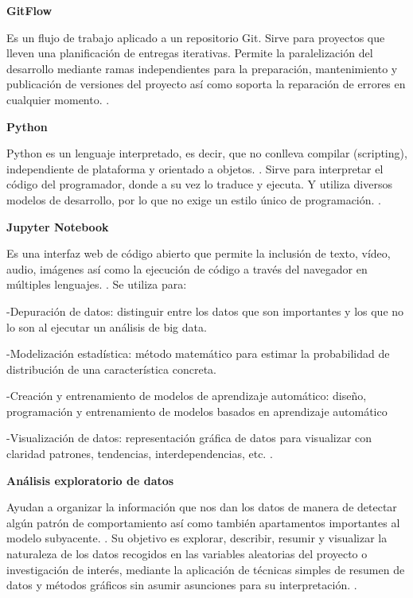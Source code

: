 \documentclass[12pt,letterpaper]{article}
\begin{document}
\item\textbf{GitFlow}
\item Es un flujo de trabajo aplicado a un repositorio Git. 
Sirve para proyectos que lleven una planificaci\'on de entregas iterativas. Permite la paralelización del desarrollo mediante ramas independientes para la preparaci\'on, mantenimiento y publicaci\'on de versiones del proyecto as\'i como soporta la reparaci\'on de errores en cualquier momento.
\cite[(Claventy. 2020)]{ref7}.

\item\textbf{Python}
\item Python es un lenguaje interpretado, es decir, que no conlleva compilar (scripting), independiente de plataforma y orientado a objetos. 
\cite[(Desarrollo Web. 2003)]{ref8}.
Sirve para interpretar el c\'odigo del programador, donde a su vez lo traduce y ejecuta. Y utiliza diversos modelos de desarrollo, por lo que no exige un estilo \'unico de programaci\'on.
\cite[(Angeles, J. 2020)]{ref9}.


\item\textbf{Jupyter Notebook}
\item Es una interfaz web de c\'odigo abierto que permite la inclusi\'on de texto, v\'ideo, audio, im\'agenes as\'i como la ejecuci\'on de c\'odigo a trav\'es del navegador en m\'ultiples lenguajes. 
\cite[(Cabrera, E. y Diaz, E. s.f.)]{ref10}.
Se utiliza para: 
\item-Depuraci\'on de datos: distinguir entre los datos que son importantes y los que no lo son al ejecutar un an\'alisis de big data.
\item-Modelizaci\'on estad\'istica: m\'etodo matem\'atico para estimar la probabilidad de distribuci\'on de una caracter\'istica concreta.
\item-Creaci\'on y entrenamiento de modelos de aprendizaje autom\'atico: diseño, programaci\'on y entrenamiento de modelos basados en aprendizaje autom\'atico
\item-Visualizaci\'on de datos: representaci\'on gr\'afica de datos para visualizar con claridad patrones, tendencias, interdependencias, etc.
\cite[(Digital Guide IONOS. s.f.)]{ref11}.

\item\textbf{An\'alisis exploratorio de datos}
\item Ayudan a organizar la informaci\'on que nos dan los datos de manera de detectar alg\'un patr\'on de comportamiento as\'i como tambi\'en apartamentos importantes al modelo subyacente.
\cite[(Orellana, L. s.f.)]{ref12}.
Su objetivo es explorar, describir, resumir y visualizar la naturaleza de los datos recogidos en las variables aleatorias del proyecto o investigaci\'on de inter\'es, mediante la aplicaci\'on de t\'ecnicas simples de resumen de datos y m\'etodos gr\'aficos sin asumir asunciones para su interpretaci\'on.
\cite[(Helix Bios. s.f.)]{ref13}.
\end{document}
